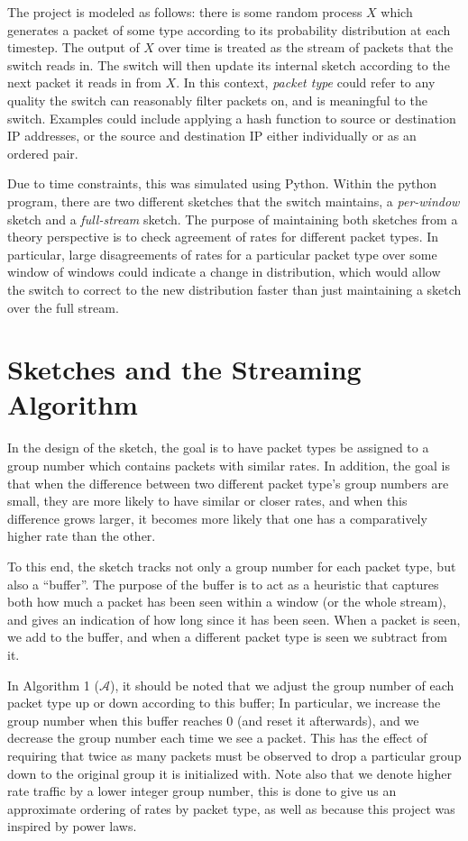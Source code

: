 \documentclass[conference]{IEEEtran}
\begin{document}
The project is modeled as follows: there is some random process $X$ which generates a packet of some type according to its probability distribution at each timestep.  The output of $X$ over time is treated as the stream of packets that the switch reads in.  The switch will then update its internal sketch according to the next packet it reads in from $X$.  In this context, \textit{packet type} could refer to any quality the switch can reasonably filter packets on, and is meaningful to the switch.  Examples could include applying a hash function to source or destination IP addresses, or the source and destination IP either individually or as an ordered pair.

Due to time constraints, this was simulated using Python.  Within the python program, there are two different sketches that the switch maintains, a \textit{per-window} sketch and a \textit{full-stream} sketch.  The purpose of maintaining both sketches from a theory perspective is to check agreement of rates for different packet types.  In particular, large disagreements of rates for a particular packet type over some window of windows could indicate a change in distribution, which would allow the switch to correct to the new distribution faster than just maintaining a sketch over the full stream.

\section{Sketches and the Streaming Algorithm}
In the design of the sketch, the goal is to have packet types be assigned to a group number which contains packets with similar rates.  In addition, the goal is that when the difference between two different packet type's group numbers are small, they are more likely to have similar or closer rates, and when this difference grows larger, it becomes more likely that one has a comparatively higher rate than the other.

To this end, the sketch tracks not only a group number for each packet type, but also a ``buffer''.  The purpose of the buffer is to act as a heuristic that captures both how much a packet has been seen within a window (or the whole stream), and gives an indication of how long since it has been seen.  When a packet is seen, we add to the buffer, and when a different packet type is seen we subtract from it.

In Algorithm 1 ($\mathcal{A}$), it should be noted that we adjust the group number of each packet type up or down according to this buffer;  In particular, we increase the group number when this buffer reaches 0 (and reset it afterwards), and we decrease the group number each time we see a packet.  This has the effect of requiring that twice as many packets must be observed to drop a particular group down to the original group it is initialized with.  Note also that we denote higher rate traffic by a lower integer group number, this is done to give us an approximate ordering of rates by packet type, as well as because this project was inspired by power laws.
\end{document}
